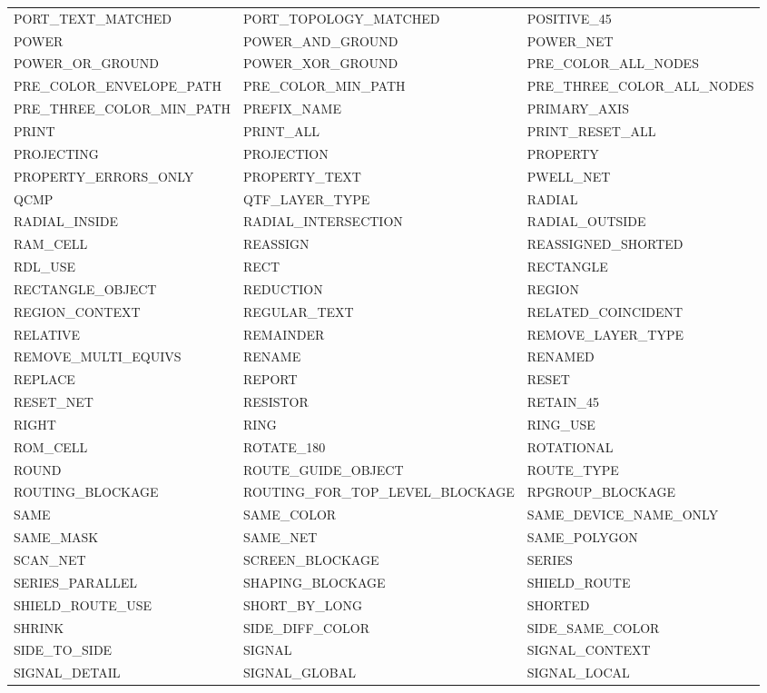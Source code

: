\begin{longtable}{@{}>{\raggedright\arraybackslash\ttfamily}p{} >{\raggedright\arraybackslash\ttfamily}p{} >{\raggedright\arraybackslash\ttfamily}p{}@{}}
PORT\_TEXT\_MATCHED & PORT\_TOPOLOGY\_MATCHED & POSITIVE\_45 \\
POWER & POWER\_AND\_GROUND & POWER\_NET \\
POWER\_OR\_GROUND & POWER\_XOR\_GROUND & PRE\_COLOR\_ALL\_NODES \\
PRE\_COLOR\_ENVELOPE\_PATH & PRE\_COLOR\_MIN\_PATH & PRE\_THREE\_COLOR\_ALL\_NODES \\
PRE\_THREE\_COLOR\_MIN\_PATH & PREFIX\_NAME & PRIMARY\_AXIS \\
PRINT & PRINT\_ALL & PRINT\_RESET\_ALL \\
PROJECTING & PROJECTION & PROPERTY \\
PROPERTY\_ERRORS\_ONLY & PROPERTY\_TEXT & PWELL\_NET \\
QCMP & QTF\_LAYER\_TYPE & RADIAL \\
RADIAL\_INSIDE & RADIAL\_INTERSECTION & RADIAL\_OUTSIDE \\
RAM\_CELL & REASSIGN & REASSIGNED\_SHORTED \\
RDL\_USE & RECT & RECTANGLE \\
RECTANGLE\_OBJECT & REDUCTION & REGION \\
REGION\_CONTEXT & REGULAR\_TEXT & RELATED\_COINCIDENT \\
RELATIVE & REMAINDER & REMOVE\_LAYER\_TYPE \\
REMOVE\_MULTI\_EQUIVS & RENAME & RENAMED \\
REPLACE & REPORT & RESET \\
RESET\_NET & RESISTOR & RETAIN\_45 \\
RIGHT & RING & RING\_USE \\
ROM\_CELL & ROTATE\_180 & ROTATIONAL \\
ROUND & ROUTE\_GUIDE\_OBJECT & ROUTE\_TYPE \\
ROUTING\_BLOCKAGE & ROUTING\_FOR\_TOP\_LEVEL\_BLOCKAGE & RPGROUP\_BLOCKAGE \\
SAME & SAME\_COLOR & SAME\_DEVICE\_NAME\_ONLY \\
SAME\_MASK & SAME\_NET & SAME\_POLYGON \\
SCAN\_NET & SCREEN\_BLOCKAGE & SERIES \\
SERIES\_PARALLEL & SHAPING\_BLOCKAGE & SHIELD\_ROUTE \\
SHIELD\_ROUTE\_USE & SHORT\_BY\_LONG & SHORTED \\
SHRINK & SIDE\_DIFF\_COLOR & SIDE\_SAME\_COLOR \\
SIDE\_TO\_SIDE & SIGNAL & SIGNAL\_CONTEXT \\
SIGNAL\_DETAIL & SIGNAL\_GLOBAL & SIGNAL\_LOCAL \\

\end{longtable}
